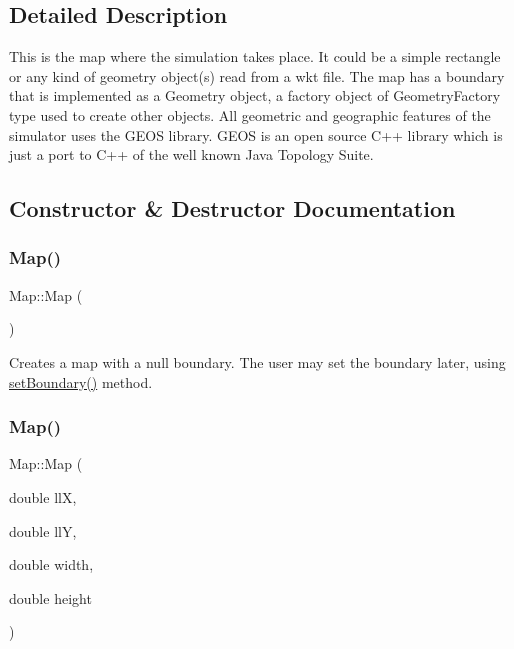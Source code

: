 \subsection{Detailed Description}
This is the map where the simulation takes place. It could be a simple rectangle or any kind of geometry object(s) read from a wkt file. The map has a boundary that is implemented as a Geometry object, a factory object of Geometry\+Factory type used to create other objects. All geometric and geographic features of the simulator uses the G\+E\+OS library. G\+E\+OS is an open source C++ library which is just a port to C++ of the well known Java Topology Suite. 

\subsection{Constructor \& Destructor Documentation}
\mbox{\label{class_map_a0f5ad0fd4563497b4214038cbca8b582}} 
\subsubsection{\texorpdfstring{Map()}{Map()}\hspace{0.1cm}{\footnotesize\ttfamily [1/3]}}
{\footnotesize\ttfamily Map\+::\+Map (\begin{DoxyParamCaption}{ }\end{DoxyParamCaption})}

Creates a map with a null boundary. The user may set the boundary later, using \mbox{\hyperlink{class_map_acede2ccba9bf0f987f3dde8c332bec17}{set\+Boundary()}} method. \mbox{\label{class_map_a4c9545a0252613e2a6808932fe83f9ad}} 
\subsubsection{\texorpdfstring{Map()}{Map()}\hspace{0.1cm}{\footnotesize\ttfamily [2/3]}}
{\footnotesize\ttfamily Map\+::\+Map (\begin{DoxyParamCaption}\item[{double}]{llX,  }\item[{double}]{llY,  }\item[{double}]{width,  }\item[{double}]{height }\end{DoxyParamCaption})}

